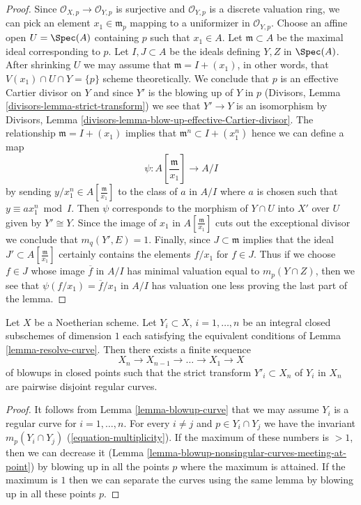 \begin{proof}
Since $\mathcal{O}_{X, p} \to \mathcal{O}_{Y, p}$ is surjective and
$\mathcal{O}_{Y, p}$ is a discrete valuation ring, we can pick an
element $x_1 \in \mathfrak m_p$ mapping to a uniformizer in
$\mathcal{O}_{Y, p}$. Choose an affine open $U = \Spec(A)$ containing
$p$ such that $x_1 \in A$. Let $\mathfrak m \subset A$ be the
maximal ideal corresponding to $p$. Let $I, J \subset A$
be the ideals defining $Y, Z$ in $\Spec(A)$. After shrinking $U$
we may assume that $\mathfrak m = I + (x_1)$, in other words,
that $V(x_1) \cap U \cap Y = \{p\}$ scheme theoretically.
We conclude that $p$ is an effective Cartier divisor on $Y$ and
since $Y'$ is the blowing up of $Y$ in $p$
(Divisors, Lemma \ref{divisors-lemma-strict-transform})
we see that $Y' \to Y$ is an isomorphism by
Divisors, Lemma \ref{divisors-lemma-blow-up-effective-Cartier-divisor}.
The relationship $\mathfrak m = I + (x_1)$ implies that
$\mathfrak m^n \subset I + (x_1^n)$ hence we can define a map
$$
\psi : A[\textstyle{\frac{\mathfrak m}{x_1}}] \longrightarrow A/I
$$
by sending $y/x_1^n \in A[\frac{\mathfrak m}{x_1}]$
to the class of $a$ in $A/I$ where $a$
is chosen such that $y \equiv ax_1^n \bmod I$.
Then $\psi$ corresponds to the morphism of $Y \cap U$ into $X'$
over $U$ given by $Y' \cong Y$. Since the image of $x_1$
in $A[\frac{\mathfrak m}{x_1}]$ cuts out the exceptional divisor
we conclude that $m_q(Y', E) = 1$. Finally, since
$J \subset \mathfrak m$ implies that the ideal
$J' \subset A[\frac{\mathfrak m}{x_1}]$ certainly
contains the elements $f/x_1$ for $f \in J$.
Thus if we choose $f \in J$ whose image $\overline{f}$ in $A/I$ has
minimal valuation equal to $m_p(Y \cap Z)$, then we see that
$\psi(f/x_1) = \overline{f}/x_1$ in $A/I$ has valuation one less
proving the last part of the lemma.
\end{proof}

\begin{lemma}
\label{lemma-blowup-curves}
Let $X$ be a Noetherian scheme. Let $Y_i \subset X$, $i = 1, \ldots, n$
be an integral closed subschemes of dimension $1$ each satisfying the
equivalent conditions of Lemma \ref{lemma-resolve-curve}. Then there
exists a finite sequence
$$
X_n \to X_{n - 1} \to \ldots \to X_1 \to X
$$
of blowups in closed points such that the strict transform $Y'_i \subset X_n$
of $Y_i$ in $X_n$ are pairwise disjoint regular curves.
\end{lemma}

\begin{proof}
It follows from Lemma \ref{lemma-blowup-curve} that we may assume $Y_i$
is a regular curve for $i = 1, \ldots, n$. For every $i \not = j$
and $p \in Y_i \cap Y_j$ we have the invariant
$m_p(Y_i \cap Y_j)$ (\ref{equation-multiplicity}).
If the maximum of these numbers is $> 1$, then we can decrease
it (Lemma \ref{lemma-blowup-nonsingular-curves-meeting-at-point})
by blowing up in all the points $p$ where the maximum is attained.
If the maximum is $1$ then we can separate the curves using the
same lemma by blowing up in all these points $p$.
\end{proof}

